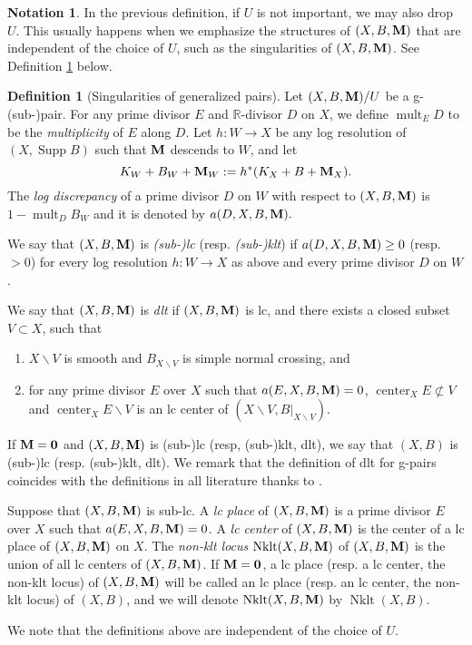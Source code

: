 \documentclass[11pt]{amsart}
\numberwithin{equation}{section}
\newcommand{\Mm}{{\bf{M}}}
\newcommand{\Center}{\operatorname{center}}
\newcommand{\Nklt}{\operatorname{Nklt}}
\newcommand{\Supp}{\operatorname{Supp}}
\newcommand{\mult}{\operatorname{mult}}
\theoremstyle{definition}
\newtheorem{defn}[thm]{Definition}
\theoremstyle{definition}
\newtheorem{nota}[thm]{Notation}
\theoremstyle{definition}
\begin{document}
\begin{nota}
In the previous definition, if $U$ is not important, we may also drop $U$. This usually happens when we emphasize the structures of $(X,B,\Mm)$ that are independent of the choice of $U$, such as the singularities of $(X,B,\Mm)$. See Definition \ref{defn: sing of g-pairs} below.
\end{nota}

\begin{defn}[Singularities of generalized pairs]\label{defn: sing of g-pairs}
	Let $(X,B,\Mm)/U$ be a g-(sub-)pair. For any prime divisor $E$ and $\mathbb R$-divisor $D$ on $X$, we define $\mult_{E}D$ to be the \emph{multiplicity} of $E$ along $D$.  Let $h:W\to X$
	be any log resolution of $(X,\Supp B)$ such that $\Mm$ descends to $W$, and let
	$$K_W+B_W+\Mm_W:=h^*(K_X+B+\Mm_X).$$
	The \emph{log discrepancy} of a prime divisor $D$ on $W$ with respect to $(X,B,\Mm)$ is $1-\mult_{D}B_W$ and it is denoted by $a(D,X,B,\Mm).$
	
	We say that $(X,B,\Mm)$ is \emph{(sub-)lc} (resp. \emph{(sub-)klt}) if $a(D,X,B,\Mm)\ge0$ (resp. $>0$) for every log resolution $h: W\to X$ as above and every prime divisor $D$ on $W$. 
	
	We say that $(X,B,\Mm)$ is \emph{dlt} if $(X,B,\Mm)$ is lc, and there exists a closed subset $V\subset X$, such that
\begin{enumerate}
    \item $X\backslash V$ is smooth and $B_{X\backslash V}$ is simple normal crossing, and
    \item for any prime divisor $E$ over $X$ such that $a(E,X,B,\Mm)=0$, $\Center_XE\not\subset V$ and $\Center_XE\backslash V$ is an lc center of $(X\backslash V,B|_{X\backslash V})$.
\end{enumerate}
If $\Mm=\bm{0}$ and $(X,B,\Mm)$ is (sub-)lc (resp, (sub-)klt, dlt), we say that $(X,B)$ is (sub-)lc (resp. (sub-)klt, dlt). We remark that the definition of dlt for g-pairs coincides with the definitions in all literature thanks to \cite[Theorem 6.1]{Has22}.
	    
	 Suppose that $(X,B,\Mm)$ is sub-lc. A \emph{lc place} of $(X,B,\Mm)$ is a prime divisor $E$ over $X$ such that $a(E,X,B,\Mm)=0$. A \emph{lc center} of $(X,B,\Mm)$ is the center of a lc place of $(X,B,\Mm)$ on $X$. The \emph{non-klt locus} $\Nklt(X,B,\Mm)$ of $(X,B,\Mm)$ is the union of all lc centers of $(X,B,\Mm)$. If $\Mm=\bm{0}$, a lc place (resp. a lc center, the non-klt locus) of $(X,B,\Mm)$ will be called an lc place (resp. an lc center, the non-klt locus) of $(X,B)$, and we will denote $\Nklt(X,B,\Mm)$ by $\Nklt(X,B)$. 
	 
	 We note that the definitions above are independent of the choice of $U$.
\end{defn}
\end{document}
